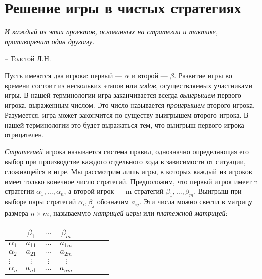 \chapter{Решение игры в чистых стратегиях}
\label{cha:7}

\epigraph{
  \textit{И каждый из этих проектов, основанных на стратегии и тактике, противоречит один другому.}}
{-- Толстой Л.Н.}

Пусть имеются два игрока: первый — $\alpha$ и второй — $\beta$. Развитие игры во времени состоит из нескольких этапов или \textit{ходов}, осуществляемых участниками игры. В нашей терминологии игра заканчивается всегда \textit{выигрышем} первого игрока, выраженным числом. Это число называется \textit{проигрышем} второго игрока. Разумеется, игра может закончится по существу выигрышем второго игрока. В нашей терминологии это будет выражаться тем, что выигрыш первого игрока отрицателен.

\textit{Стратегией} игрока называется система правил, однозначно определяющая его выбор при производстве каждого отдельного хода в зависимости от ситуации, сложивщейся в игре. Мы рассмотрим лишь игры, в которых каждый из игроков имеет только конечное число стратегий. Предположим, что первый игрок имеет n стратегии $\alpha_1, \dots, \alpha_n$, а второй игрок — m стратегий $\beta_1, \dots, \beta_m$. Выигрыш при выборе пары стратегий $\alpha_i, \beta_j$ обозначим $a_{ij}$. Эти числа можно свести в матрицу размера $n \times m$, называемую \textit{матрицей игры} или \textit{платежной матрицей}:

\begin{center}
  \begin{tabular}{ | l || c | c | c | c | c | c | r |}
    \hline
     & $\beta_1$ & $\dots$ & $\beta_m$ \\ \hline \hline
    $\alpha_1$ & $a_{11}$ & $\dots$ & $a_{1m}$ \\ \hline
    $\alpha_2$ & $a_{21}$ & $\dots$ & $a_{2m}$ \\ \hline
    $\vdots$ & $\vdots$ & $\vdots$ & $\vdots$ \\ \hline
    $\alpha_n$ & $a_{n1}$ & $\dots$ & $a_{nm}$ \\ \hline
  \end{tabular}
\end{center}

